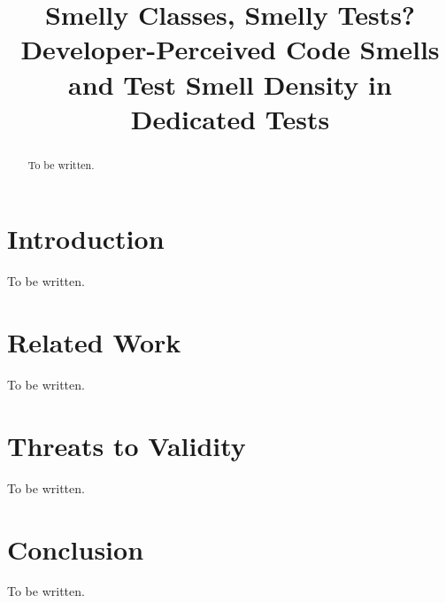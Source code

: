 \documentclass[conference]{IEEEtran}
\begin{document}
\title{Smelly Classes, Smelly Tests? Developer-Perceived Code Smells and Test Smell
Density in Dedicated Tests}

\author{}

\maketitle

\begin{abstract}
To be written.
\end{abstract}

\section{Introduction}
To be written.

\section{Related Work}
To be written.





\section{Threats to Validity}
To be written.

\section{Conclusion}
To be written.



\end{document}
